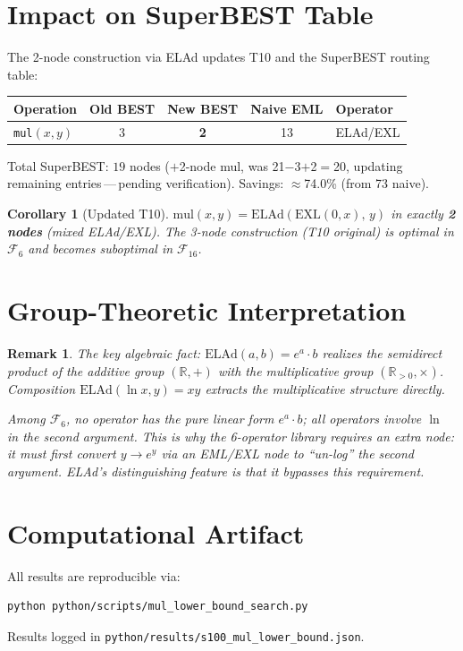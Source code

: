 \documentclass[11pt]{article}
\newtheorem{corollary}[theorem]{Corollary}
\newtheorem{remark}{Remark}
\begin{document}
\section{Impact on SuperBEST Table}

The 2-node construction via ELAd updates T10 and the SuperBEST routing table:

\begin{center}
\begin{tabular}{lcccl}
\hline
Operation & Old BEST & New BEST & Naive EML & Operator \\
\hline
\texttt{mul}$(x,y)$ & 3 & \textbf{2} & 13 & ELAd/EXL \\
\hline
\end{tabular}
\end{center}

Total SuperBEST: $19$ nodes ($+$2-node mul, was 21$-$3$+$2$=$20, updating
remaining entries\,---\,pending verification).  Savings: $\approx$74.0\% (from 73 naive).

\begin{corollary}[Updated T10]
$\mathrm{mul}(x,y) = \mathrm{ELAd}(\mathrm{EXL}(0,x),\, y)$ in exactly
\textbf{2 nodes} (mixed ELAd/EXL). The 3-node construction (T10 original) is
optimal in $\mathcal{F}_6$ and becomes suboptimal in $\mathcal{F}_{16}$.
\end{corollary}

\section{Group-Theoretic Interpretation}

\begin{remark}
The key algebraic fact: $\mathrm{ELAd}(a,b) = e^a \cdot b$ realizes the \emph{semidirect
product} of the additive group $({\mathbb R}, +)$ with the multiplicative group
$({\mathbb R}_{>0}, \times)$.  Composition $\mathrm{ELAd}(\ln x, y) = xy$ extracts
the multiplicative structure directly.

Among $\mathcal{F}_6$, no operator has the pure \emph{linear} form $e^a \cdot b$;
all operators involve $\ln$ in the second argument.  This is why the 6-operator
library requires an extra node: it must first convert $y \to e^y$ via an EML/EXL
node to ``un-log'' the second argument.  ELAd's distinguishing feature is that it
bypasses this requirement.
\end{remark}

\section*{Computational Artifact}
All results are reproducible via:
\begin{verbatim}
python python/scripts/mul_lower_bound_search.py
\end{verbatim}
Results logged in \texttt{python/results/s100\_mul\_lower\_bound.json}.
\end{document}
